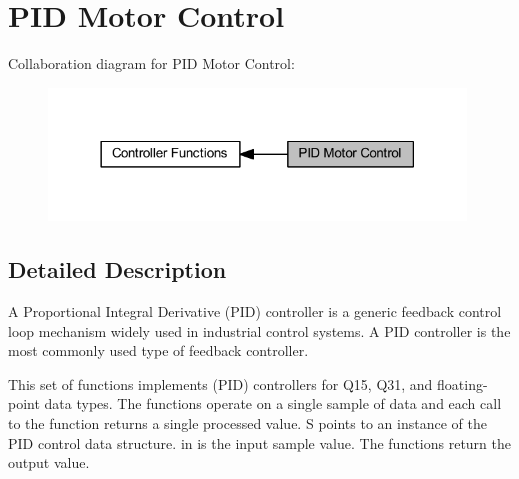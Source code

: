 \hypertarget{group___p_i_d}{}\section{P\+ID Motor Control}
\label{group___p_i_d}
Collaboration diagram for P\+ID Motor Control\+:
\nopagebreak
\begin{figure}[H]
\begin{center}
\leavevmode
\includegraphics[width=314pt]{group___p_i_d}
\end{center}
\end{figure}


\subsection{Detailed Description}
A Proportional Integral Derivative (P\+ID) controller is a generic feedback control loop mechanism widely used in industrial control systems. A P\+ID controller is the most commonly used type of feedback controller.

This set of functions implements (P\+ID) controllers for Q15, Q31, and floating-\/point data types. The functions operate on a single sample of data and each call to the function returns a single processed value. {\ttfamily S} points to an instance of the P\+ID control data structure. {\ttfamily in} is the input sample value. The functions return the output value.

